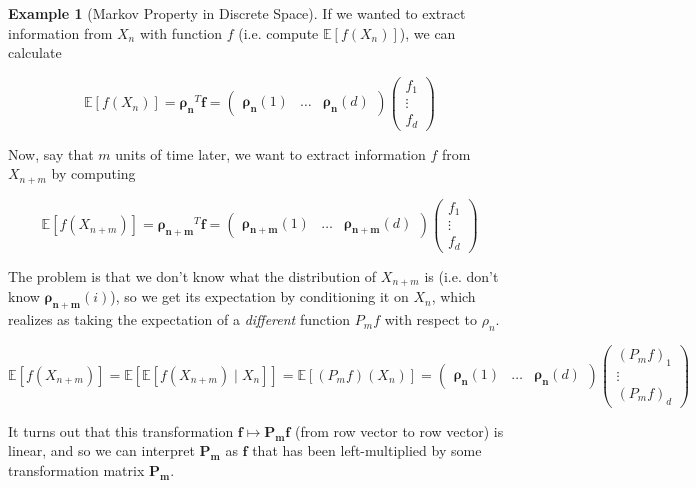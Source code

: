 \documentclass{article}
\theoremstyle{definition}
\newtheorem{example}{Example}[section]
\theoremstyle{remark}
\theoremstyle{definition}
\begin{document}
  \begin{example}[Markov Property in Discrete Space]
    If we wanted to extract information from $X_n$ with function $f$ (i.e. compute $\mathbb{E}[f(X_n)]$), we can calculate 

      \[\mathbb{E}[f(X_n)] = \boldsymbol{\rho_n}^T \mathbf{f} =  \begin{pmatrix} \boldsymbol{\rho_n} (1) & \ldots & \boldsymbol{\rho_n} (d) \end{pmatrix} \begin{pmatrix} f_1 \\ \vdots \\ f_d \end{pmatrix}\] 

    Now, say that $m$ units of time later, we want to extract information $f$ from $X_{n + m}$ by computing 

      \[\mathbb{E}[f(X_{n + m})] = \boldsymbol{\rho_{n + m}}^T \mathbf{f} = \begin{pmatrix} \boldsymbol{\rho_{n+m}} (1) & \ldots &  \boldsymbol{\rho_{n+m}} (d) \end{pmatrix} \begin{pmatrix} f_1 \\ \vdots \\ f_d \end{pmatrix}\]

    The problem is that we don't know what the distribution of $X_{n + m}$ is (i.e. don't know $\boldsymbol{\rho_{n + m}} (i)$), so we get its expectation by conditioning it on $X_n$, which realizes as taking the expectation of a \textit{different} function $P_m f$ with respect to $\rho_n$. 

      \[\mathbb{E}[f(X_{n + m})] = \mathbb{E}[ \mathbb{E}[ f(X_{n + m}) \mid X_n]] = \mathbb{E}[(P_m f)(X_n)] = \begin{pmatrix} \boldsymbol{\rho_n} (1) & \ldots & \boldsymbol{\rho_n} (d) \end{pmatrix} \begin{pmatrix} (P_m f)_1 \\ \vdots \\(P_m f)_d \end{pmatrix}\]

    It turns out that this transformation $\mathbf{f} \mapsto \mathbf{P_m} \mathbf{f}$ (from row vector to row vector) is linear, and so we can interpret $\mathbf{P_m}$ as $\mathbf{f}$ that has been left-multiplied by some transformation matrix $\mathbf{P_m}$. 


\end{example}
\end{document}
